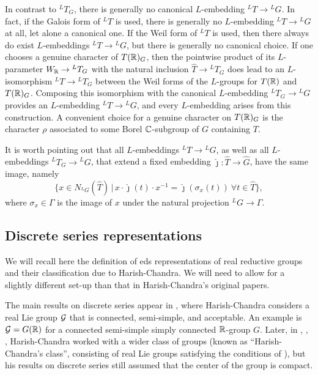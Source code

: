 \documentclass{article}
\theoremstyle{definition}
\numberwithin{equation}{section}
\renewcommand{\-}{\hyp{}}
\begin{document}
In contrast to $^LT_G$, there is generally no canonical $L$\-embedding $^LT \to {^LG}$. In fact, if the Galois form of $^LT$ is used, there is generally no $L$\-embedding $^LT \to {^LG}$ at all, let alone a canonical one. If the Weil form of $^LT$ is used, then there always do exist $L$\-embeddings $^LT \to {^LG}$, but there is generally no canonical choice. If one chooses a genuine character of $T(\mathbb{R})_G$, then the pointwise product of its $L$\-parameter $W_{\mathbb{R}} \to {^LT_G}$ with the natural inclusion $\hat T \to {^LT_G}$ does lead to an $L$\-isomorphism $^LT \to {^LT_G}$ between the Weil forms of the $L$\-groups for $T(\mathbb{R})$ and $T(\mathbb{R})_G$. Composing this isomorphism with the canonical $L$\-embedding $^LT_G \to {^LG}$ provides an $L$\-embedding $^LT \to {^LG}$, and every $L$\-embedding arises from this construction. A convenient choice for a genuine character on $T(\mathbb{R})_G$ is the character $\rho$ associated to some Borel $\mathbb{C}$-subgroup of $G$ containing $T$.

It is worth pointing out that all $L$\-embeddings $^LT \to {^LG}$, as well as all $L$\-embeddings $^LT_G \to {^LG}$, that extend a fixed embedding $\hat\jmath : \hat T \to \hat G$, have the same image, namely
\begin{equation} \label{eq:lembim}
\{x \in N_{^LG}(\hat T)\,|\, x\cdot\hat\jmath(t)\cdot x^{-1} = \hat\jmath(\sigma_x(t))\ \forall t \in \hat T\},
\end{equation}
where $\sigma_x \in \Gamma$ is the image of $x$ under the natural projection $^LG \to \Gamma$.


\subsection{Discrete series representations} \label{sub:essds}

We will recall here the definition of eds representations of real reductive groups and their classification due to Harish-Chandra. We will need to allow for a slightly different set-up than that in Harish-Chandra's original papers.

The main results on discrete series appear in \cite{HCDSI}, where Harish-Chandra considers a real Lie group $\mathcal{G}$ that is connected, semi-simple, and acceptable. An example is $\mathcal{G}=G(\mathbb{R})$ for a connected semi-simple simply connected $\mathbb{R}$-group $G$. Later, in \cite{HC-R1}, \cite{HC-R2}, \cite{HC-R3}, Harish-Chandra worked with a wider class of groups (known as ``Harish-Chandra's class'', consisting of real Lie groups satisfying the conditions of \cite[\S3]{HC-R1}), but his results on discrete series still assumed that the center of the group is compact. 
\end{document}
